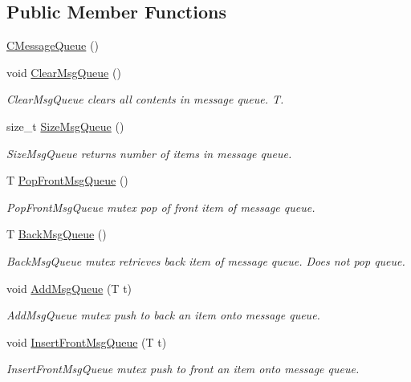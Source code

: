 \subsection*{Public Member Functions}
\begin{DoxyCompactItemize}
\item 
\hyperlink{classRCS_1_1CMessageQueue_afa0f086027abffe37b9e9673396f7b00}{C\-Message\-Queue} ()
\item 
void \hyperlink{classRCS_1_1CMessageQueue_a1fbabdd6e6aaf02572a93531ed871559}{Clear\-Msg\-Queue} ()
\begin{DoxyCompactList}\small\item\em Clear\-Msg\-Queue clears all contents in message queue. T. \end{DoxyCompactList}\item 
size\-\_\-t \hyperlink{classRCS_1_1CMessageQueue_a7929c4ce871eab3dfb8dfabd5bf4bdb9}{Size\-Msg\-Queue} ()
\begin{DoxyCompactList}\small\item\em Size\-Msg\-Queue returns number of items in message queue. \end{DoxyCompactList}\item 
T \hyperlink{classRCS_1_1CMessageQueue_afbde6b0fa4044557ba5f990c69d52ff7}{Pop\-Front\-Msg\-Queue} ()
\begin{DoxyCompactList}\small\item\em Pop\-Front\-Msg\-Queue mutex pop of front item of message queue. \end{DoxyCompactList}\item 
T \hyperlink{classRCS_1_1CMessageQueue_a5d669a3cecd23be9113567421f2b06a1}{Back\-Msg\-Queue} ()
\begin{DoxyCompactList}\small\item\em Back\-Msg\-Queue mutex retrieves back item of message queue. Does not pop queue. \end{DoxyCompactList}\item 
void \hyperlink{classRCS_1_1CMessageQueue_a1f23fdbd7b3c7c3861abea8fb0899288}{Add\-Msg\-Queue} (T t)
\begin{DoxyCompactList}\small\item\em Add\-Msg\-Queue mutex push to back an item onto message queue. \end{DoxyCompactList}\item 
void \hyperlink{classRCS_1_1CMessageQueue_ab9a9aa2c8e05c74bd0b67dc2b576850f}{Insert\-Front\-Msg\-Queue} (T t)
\begin{DoxyCompactList}\small\item\em Insert\-Front\-Msg\-Queue mutex push to front an item onto message queue. \end{DoxyCompactList}\end{DoxyCompactItemize}
